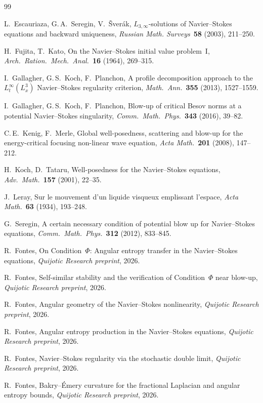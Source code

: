 \documentclass[11pt]{article}
\theoremstyle{definition}
\begin{document}
\begin{thebibliography}{99}

L.~Escauriaza, G.\,A.~Seregin, V.~\v{S}ver\'ak,
$L_{3,\infty}$-solutions of Navier--Stokes equations and
backward uniqueness,
\emph{Russian Math. Surveys}~\textbf{58} (2003), 211--250.

H.~Fujita, T.~Kato,
On the Navier--Stokes initial value problem~I,
\emph{Arch.\ Ration.\ Mech.\ Anal.}~\textbf{16} (1964),
269--315.

I.~Gallagher, G.\,S.~Koch, F.~Planchon,
A profile decomposition approach to the $L^{\infty}_t(L^3_x)$
Navier--Stokes regularity criterion,
\emph{Math.\ Ann.}~\textbf{355} (2013), 1527--1559.

I.~Gallagher, G.\,S.~Koch, F.~Planchon,
Blow-up of critical Besov norms at a potential
Navier--Stokes singularity,
\emph{Comm.\ Math.\ Phys.}~\textbf{343} (2016), 39--82.

C.\,E.~Kenig, F.~Merle,
Global well-posedness, scattering and blow-up for the
energy-critical focusing non-linear wave equation,
\emph{Acta Math.}~\textbf{201} (2008), 147--212.

H.~Koch, D.~Tataru,
Well-posedness for the Navier--Stokes equations,
\emph{Adv.\ Math.}~\textbf{157} (2001), 22--35.

J.~Leray,
Sur le mouvement d'un liquide visqueux emplissant l'espace,
\emph{Acta Math.}~\textbf{63} (1934), 193--248.

G.~Seregin,
A certain necessary condition of potential blow up for
Navier--Stokes equations,
\emph{Comm.\ Math.\ Phys.}~\textbf{312} (2012), 833--845.

R.~Fontes,
On Condition~$\Phi$: Angular entropy transfer in the
Navier--Stokes equations,
\emph{Quijotic Research preprint}, 2026.

R.~Fontes,
Self-similar stability and the verification of
Condition~$\Phi$ near blow-up,
\emph{Quijotic Research preprint}, 2026.

R.~Fontes,
Angular geometry of the Navier--Stokes nonlinearity,
\emph{Quijotic Research preprint}, 2026.

R.~Fontes,
Angular entropy production in the Navier--Stokes equations,
\emph{Quijotic Research preprint}, 2026.

R.~Fontes,
Navier--Stokes regularity via the stochastic double limit,
\emph{Quijotic Research preprint}, 2026.

R.~Fontes,
Bakry--\'Emery curvature for the fractional Laplacian
and angular entropy bounds,
\emph{Quijotic Research preprint}, 2026.

\end{thebibliography}
\end{document}
